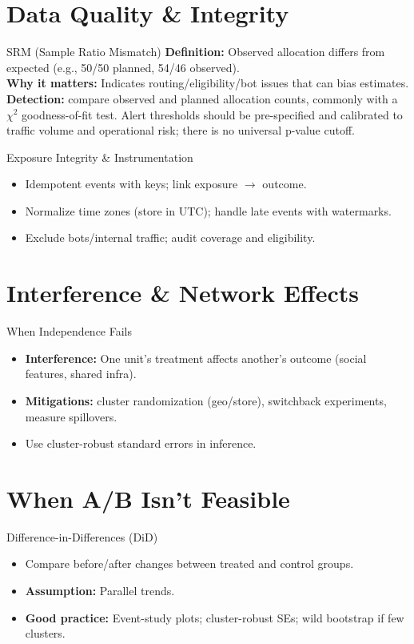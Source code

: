 \documentclass[aspectratio=169]{beamer}
\begin{document}
\section{Data Quality \& Integrity}
\begin{frame}{SRM (Sample Ratio Mismatch)}
  \textbf{Definition:} Observed allocation differs from expected (e.g., 50/50 planned, 54/46 observed).\\[0.5em]
  \textbf{Why it matters:} Indicates routing/eligibility/bot issues that can bias estimates.\\[0.5em]
  \textbf{Detection:} compare observed and planned allocation counts, commonly with a $\chi^2$ goodness-of-fit test. Alert thresholds should be pre-specified and calibrated to traffic volume and operational risk; there is no universal p-value cutoff.
\end{frame}

\begin{frame}{Exposure Integrity \& Instrumentation}
  \begin{itemize}
    \item Idempotent events with keys; link exposure $\rightarrow$ outcome.
    \item Normalize time zones (store in UTC); handle late events with watermarks.
    \item Exclude bots/internal traffic; audit coverage and eligibility.
  \end{itemize}
\end{frame}

\section{Interference \& Network Effects}
\begin{frame}{When Independence Fails}
  \begin{itemize}
    \item \textbf{Interference:} One unit's treatment affects another's outcome (social features, shared infra).
    \item \textbf{Mitigations:} cluster randomization (geo/store), switchback experiments, measure spillovers.
    \item Use cluster-robust standard errors in inference.
  \end{itemize}
\end{frame}

\section{When A/B Isn't Feasible}
\begin{frame}{Difference-in-Differences (DiD)}
  \begin{itemize}
    \item Compare before/after changes between treated and control groups.
    \item \textbf{Assumption:} Parallel trends.
    \item \textbf{Good practice:} Event-study plots; cluster-robust SEs; wild bootstrap if few clusters.
  \end{itemize}
\end{frame}
\end{document}
